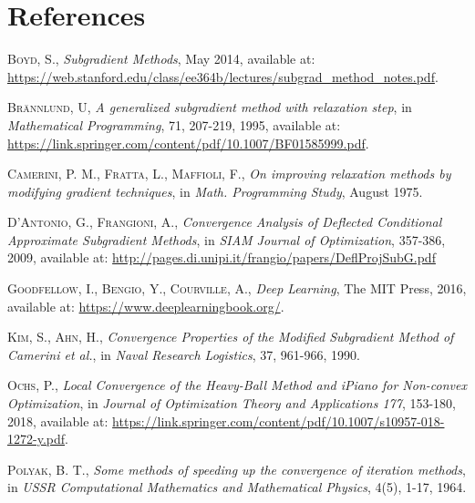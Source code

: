 \section*{References}
\label{sec:bib}
\begin{enumerate}[label={[\arabic*]}]
    \item \label{bibitem:boyd} \textsc{Boyd, S.}, \textit{Subgradient Methods}, May 2014, available at: \url{https://web.stanford.edu/class/ee364b/lectures/subgrad_method_notes.pdf}.

    \item \label{bibitem:brannlund} \textsc{Brännlund, U}, \textit{A generalized subgradient method with relaxation step}, in \textit{Mathematical Programming}, 71, 207-219, 1995, available at: \url{https://link.springer.com/content/pdf/10.1007/BF01585999.pdf}.
    
    \item \label{bibitem:cfm} \textsc{Camerini, P. M., Fratta, L., Maffioli, F.}, \textit{On improving relaxation methods by modifying gradient techniques}, in \textit{Math. Programming Study}, August 1975.

    \item \label{bibitem:frangioni} \textsc{D'Antonio, G., Frangioni, A.}, \textit{Convergence Analysis of Deflected Conditional Approximate Subgradient Methods}, in \textit{SIAM Journal of Optimization}, 357-386, 2009, available at: \url{http://pages.di.unipi.it/frangio/papers/DeflProjSubG.pdf}
    
    \item \label{bibitem:goodfellow} \textsc{Goodfellow, I., Bengio, Y., Courville, A.}, \textit{Deep Learning}, The MIT Press, 2016, available at: \url{https://www.deeplearningbook.org/}.

    \item \label{bibitem:kim} \textsc{Kim, S., Ahn, H.}, \textit{Convergence Properties of the Modified Subgradient Method of Camerini et al.}, in \textit{Naval Research Logistics}, 37, 961-966, 1990.
    
    \item \label{bibitem:ochs} \textsc{Ochs, P.}, \textit{Local Convergence of the Heavy-Ball Method and iPiano for Non-convex Optimization}, in \textit{Journal of Optimization Theory and Applications 177}, 153-180, 2018, available at: \url{https://link.springer.com/content/pdf/10.1007/s10957-018-1272-y.pdf}.

    \item \label{bibitem:polyak} \textsc{Polyak, B. T.}, \textit{Some methods of speeding up the convergence of iteration methods}, in \textit{USSR Computational Mathematics and Mathematical Physics}, 4(5), 1-17, 1964.

\end{enumerate}